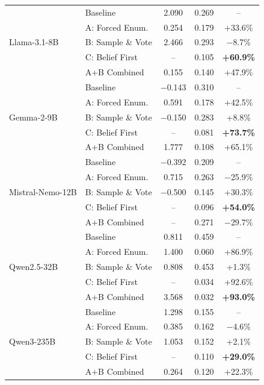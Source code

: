 \documentclass{article}
\theoremstyle{plain}
\theoremstyle{definition}
\theoremstyle{remark}
\begin{document}
\begin{table}[t]
\begin{center}
\begin{small}
\begin{tabular}{llccc}
\multirow{5}{*}{Llama-3.1-8B}
 & Baseline & 2.090 & 0.269 & -- \\
 & A: Forced Enum. & 0.254 & 0.179 & +33.6\% \\
 & B: Sample \& Vote & 2.466 & 0.293 & $-$8.7\% \\
 & C: Belief First & -- & 0.105 & \textbf{+60.9\%} \\
 & A+B Combined & 0.155 & 0.140 & +47.9\% \\
\midrule
\multirow{5}{*}{Gemma-2-9B}
 & Baseline & $-$0.143 & 0.310 & -- \\
 & A: Forced Enum. & 0.591 & 0.178 & +42.5\% \\
 & B: Sample \& Vote & $-$0.150 & 0.283 & +8.8\% \\
 & C: Belief First & -- & 0.081 & \textbf{+73.7\%} \\
 & A+B Combined & 1.777 & 0.108 & +65.1\% \\
\midrule
\multirow{5}{*}{Mistral-Nemo-12B}
 & Baseline & $-$0.392 & 0.209 & -- \\
 & A: Forced Enum. & 0.715 & 0.263 & $-$25.9\% \\
 & B: Sample \& Vote & $-$0.500 & 0.145 & +30.3\% \\
 & C: Belief First & -- & 0.096 & \textbf{+54.0\%} \\
 & A+B Combined & -- & 0.271 & $-$29.7\% \\
\midrule
\multirow{5}{*}{Qwen2.5-32B}
 & Baseline & 0.811 & 0.459 & -- \\
 & A: Forced Enum. & 1.400 & 0.060 & +86.9\% \\
 & B: Sample \& Vote & 0.808 & 0.453 & +1.3\% \\
 & C: Belief First & -- & 0.034 & +92.6\% \\
 & A+B Combined & 3.568 & 0.032 & \textbf{+93.0\%} \\
\midrule
\multirow{5}{*}{Qwen3-235B}
 & Baseline & 1.298 & 0.155 & -- \\
 & A: Forced Enum. & 0.385 & 0.162 & $-$4.6\% \\
 & B: Sample \& Vote & 1.053 & 0.152 & +2.1\% \\
 & C: Belief First & -- & 0.110 & \textbf{+29.0\%} \\
 & A+B Combined & 0.264 & 0.120 & +22.3\% \\
\bottomrule
\end{tabular}
\end{small}
\end{center}
\vskip -0.1in
\end{table}
\end{document}
